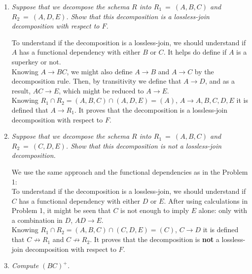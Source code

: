 \documentclass[paper=8.27in:11.69in, 14pt, DIV=calc]{scrartcl}
\begin{document}
\begin{enumerate}[label=\arabic*)]

\item \textit{Suppose that we decompose the schema $R$ into $R_{1} \ = \ (A, B, C)$ and $R_{2} \ = \ (A, D, E)$. Show that this decomposition is a lossless-join decomposition with respect to $F$.\\}

To understand if the decomposition is a lossless-join, we should understand if $A$ has a functional dependency with either $B$ or $C$. It helps do define if $A$ is a superkey or not.\\

Knowing $A \rightarrow BC$, we might also define $A \rightarrow B$ and $A \rightarrow C$ by the decomposition rule. Then, by transitivity we define that $A \rightarrow D$, and as a result, $AC \rightarrow E$, which might be reduced to $A \rightarrow E$.\\

Knowing $R_{1} \cap R_{2} = (A, B, C) \cap (A, D, E) = (A)$, $A \rightarrow A, B, C, D, E$ it is defined that $A \rightarrow R_{1}$. It proves that the decomposition is a lossless-join decomposition with respect to $F$.

\newpage
\item \textit{Suppose that we decompose the schema $R$ into $R_{1} \ = \ (A, B, C)$ and $R_{2} \ = \ (C, D, E)$. Show that this decomposition is not a lossless-join decomposition.\\}

We use the same approach and the functional dependencies as in the Problem 1:\\

To understand if the decomposition is a lossless-join, we should understand if $C$ has a functional dependency with either $D$ or $E$. After using calculations in Problem 1, it might be seen that $C$ is not enough to imply $E$ alone: only with a combination in $D$, $AD \rightarrow E$.\\

Knowing $R_{1} \cap R_{2} = (A, B, C) \cap (C, D, E) = (C)$, $C \rightarrow D$ it is defined that $C \not \rightarrow R_{1}$ and $C \not \rightarrow R_{2}$. It proves that the decomposition is \textbf{not} a lossless-join decomposition with respect to $F$.

\newpage
\item \textit{Compute $(BC)^{+}$.\\}


\end{enumerate}
\end{document}
